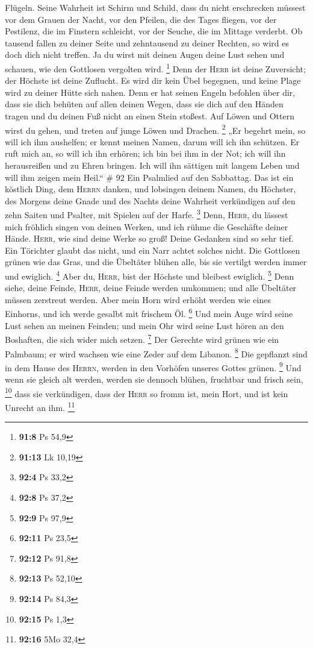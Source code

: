 Flügeln. Seine Wahrheit ist Schirm und Schild,  dass du
nicht erschrecken müssest vor dem Grauen der Nacht, vor den Pfeilen, die
des Tages fliegen,  vor der Pestilenz, die im Finstern
schleicht, vor der Seuche, die im Mittage verderbt.  Ob
tausend fallen zu deiner Seite und zehntausend zu deiner Rechten, so
wird es doch dich nicht treffen.  Ja du wirst mit deinen
Augen deine Lust sehen und schauen, wie den Gottlosen vergolten wird.
\footnote{\textbf{91:8} Ps 54,9}  Denn der \textsc{Herr}
ist deine Zuversicht; der Höchste ist deine Zuflucht.  Es
wird dir kein Übel begegnen, und keine Plage wird zu deiner Hütte sich
nahen.  Denn er hat seinen Engeln befohlen über dir, dass
sie dich behüten auf allen deinen Wegen,  dass sie dich
auf den Händen tragen und du deinen Fuß nicht an einen Stein stoßest.
 Auf Löwen und Ottern wirst du gehen, und treten auf
junge Löwen und Drachen. \footnote{\textbf{91:13} Lk 10,19}
 „Er begehrt mein, so will ich ihm aushelfen; er kennt
meinen Namen, darum will ich ihn schützen.  Er ruft mich
an, so will ich ihn erhören; ich bin bei ihm in der Not; ich will ihn
herausreißen und zu Ehren bringen.  Ich will ihn sättigen
mit langem Leben und will ihm zeigen mein Heil.`` \# 92 
Ein Psalmlied auf den Sabbattag.  Das ist ein köstlich
Ding, dem \textsc{Herrn} danken, und lobsingen deinem Namen, du
Höchster,  des Morgens deine Gnade und des Nachts deine
Wahrheit verkündigen  auf den zehn Saiten und Psalter, mit
Spielen auf der Harfe. \footnote{\textbf{92:4} Ps 33,2} 
Denn, \textsc{Herr}, du lässest mich fröhlich singen von deinen Werken,
und ich rühme die Geschäfte deiner Hände.  \textsc{Herr},
wie sind deine Werke so groß! Deine Gedanken sind so sehr tief.
 Ein Törichter glaubt das nicht, und ein Narr achtet
solches nicht.  Die Gottlosen grünen wie das Gras, und die
Übeltäter blühen alle, bis sie vertilgt werden immer und ewiglich.
\footnote{\textbf{92:8} Ps 37,2}  Aber du, \textsc{Herr},
bist der Höchste und bleibest ewiglich. \footnote{\textbf{92:9} Ps 97,9}
 Denn siehe, deine Feinde, \textsc{Herr}, deine Feinde
werden umkommen; und alle Übeltäter müssen zerstreut werden.
 Aber mein Horn wird erhöht werden wie eines Einhorns,
und ich werde gesalbt mit frischem Öl. \footnote{\textbf{92:11} Ps 23,5}
 Und mein Auge wird seine Lust sehen an meinen Feinden;
und mein Ohr wird seine Lust hören an den Boshaften, die sich wider mich
setzen. \footnote{\textbf{92:12} Ps 91,8}  Der Gerechte
wird grünen wie ein Palmbaum; er wird wachsen wie eine Zeder auf dem
Libanon. \footnote{\textbf{92:13} Ps 52,10}  Die
gepflanzt sind in dem Hause des \textsc{Herrn}, werden in den Vorhöfen
unseres Gottes grünen. \footnote{\textbf{92:14} Ps 84,3} 
Und wenn sie gleich alt werden, werden sie dennoch blühen, fruchtbar und
frisch sein, \footnote{\textbf{92:15} Ps 1,3}  dass sie
verkündigen, dass der \textsc{Herr} so fromm ist, mein Hort, und ist
kein Unrecht an ihm. \footnote{\textbf{92:16} 5Mo 32,4}

